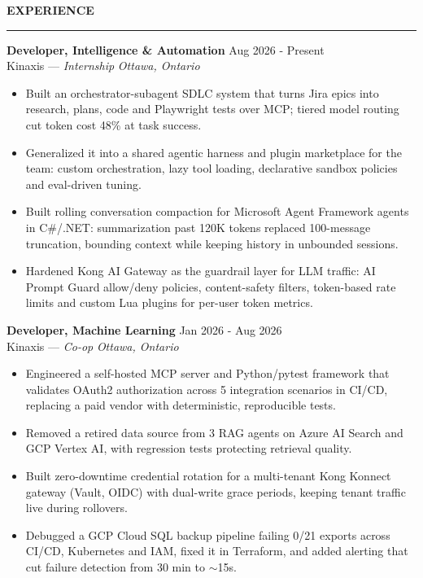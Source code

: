 \documentclass{resume}
\newcommand{\ats}[2]{\BeginAccSupp{method=pdfstringdef,ActualText={#2}}#1\EndAccSupp{}}
\newcommand{\bulletgap}{-3pt}   %
\newcommand{\headergap}{-3pt}   %
\def\sectionskip{\vspace{12pt}}     %
\renewenvironment{rSection}[1]{%
  \sectionskip
  {\large\bfseries\MakeUppercase{#1}}%
  \sectionlineskip
  \hrule
  \begin{list}{}{\setlength{\leftmargin}{0em}}
  \item[]
}{%
  \end{list}
  \vspace{-0.5em}
}
\begin{document}
\begin{rSection}{Experience}


\textbf{Developer, Intelligence \& Automation} \hfill Aug 2026 - Present\\
Kinaxis --- \textit{Internship} \hfill \textit{Ottawa, Ontario}%
\vspace{\headergap}
\begin{itemize}[leftmargin=0.15in]
    \itemsep \bulletgap {}
    \item Built an orchestrator-subagent SDLC system that turns Jira epics into research, plans, code and Playwright tests over MCP; tiered model routing cut token cost 48\% at task success.
    \item Generalized it into a shared agentic harness and plugin marketplace for the team: custom orchestration, lazy tool loading, declarative sandbox policies and eval-driven tuning.
    \item Built rolling conversation compaction for Microsoft Agent Framework agents in C\#/.NET: summarization past 120K tokens replaced 100-message truncation, bounding context while keeping history in unbounded sessions.
    \item Hardened Kong AI Gateway as the guardrail layer for LLM traffic: AI Prompt Guard allow/deny policies, content-safety filters, token-based rate limits and custom Lua plugins for per-user token metrics.
\end{itemize}

\textbf{Developer, Machine Learning} \hfill Jan 2026 - Aug 2026\\
Kinaxis --- \textit{Co-op} \hfill \textit{Ottawa, Ontario}%
\vspace{\headergap}
\vspace{\headergap}
\begin{itemize}[leftmargin=0.15in]
    \itemsep \bulletgap {}
    \item Engineered a self-hosted MCP server and Python/pytest framework that validates OAuth2 authorization across 5 integration scenarios in CI/CD, replacing a paid vendor with deterministic, reproducible tests.
    \item Removed a retired data source from 3 RAG agents on Azure AI Search and GCP Vertex AI, with regression tests protecting retrieval quality.
    \item Built zero-downtime credential rotation for a multi-tenant Kong Konnect gateway (Vault, OIDC) with dual-write grace periods, keeping tenant traffic live during rollovers.
    \item Debugged a GCP Cloud SQL backup pipeline failing 0/21 exports across CI/CD, Kubernetes and IAM, fixed it in Terraform, and added alerting that cut failure detection from 30 min to \ats{$\sim$}{\textasciitilde}15s.
\end{itemize}


\end{rSection}
\end{document}
